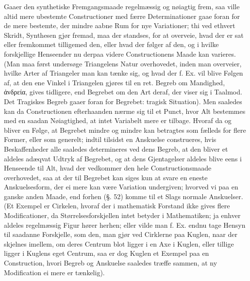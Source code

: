 \documentclass[12pt]{book}
\def\textit#1{#1}%
\def\emph#1{#1}%
\newcommand{\opage}[1]{\marginnote{\footnotesize\textit{[#1]}}}
\begin{document}
Gaaer den synthetiske Fremgangsmaade regelmæssig og nøiagtig frem, saa ville
altid mere ubestemte Constructioner med færre Determinationer gaae foran for de
mere bestemte, der mindre aabne Rum for nye Variationer; thi ved ethvert
Skridt, Synthesen gjør fremad, maa der standses, for at overveie, hvad der er
sat eller fremkommet tilligemed den, eller hvad der følger af den, og i hvilke
forskjellige Henseender nu derpaa videre Constructionens Maade kan varieres.
(Man maa først undersøge Triangelens Natur overhovedet, inden man overveier,
hvilke Arter af Triangeler man kan tænke sig,
\opage{176} og hvad der f. Ex. vil blive Følgen af, at den ene Vinkel i Triangelen gjøres
til en ret. Begreb om Mandighed, \textit{ἀνδρεία}, gives tidligere, end
Begrebet om den Art deraf, der viser sig i Taalmod. Det Tragiskes Begreb gaaer
foran for Begrebet: tragisk Situation).
Men saaledes kan da Constructionen efterhaanden nærme sig til et Punct, hvor
Alt bestemmes med en saadan Nøiagtighed, at intet Variabelt mere er tilbage.
Hvoraf da og bliver en Følge, at Begrebet mindre og mindre kan betragtes som
fælleds for flere Former, eller som generelt; indtil tilsidst en Anskuelse
construeres, hvis Beskaffenheder alle saaledes determineres ved dens Begreb, at
den bliver et aldeles adæqvat Udtryk af Begrebet, og at dens Gjentagelser
aldeles blive eens i Henseende til Alt, hvad der vedkommer den hele
Constructionsmaade overhovedet, saa at der til Begrebet kan siges kun at svare
en eneste Anskuelsesform, der ei mere kan være Variation undergiven; hvorved vi
paa en ganske anden Maade, end forhen (§. 52) komme til et Slags
\emph{normale Anskuelser}. (Et Exempel er Cirkelen, hvoraf der i mathematisk
Forstand ikke gives flere Modificationer, da Størrelsesforskjellen intet
betyder i Mathematiken; ja enhver aldeles regelmæssig Figur hører herhen; eller
vilde man f. Ex. endnu tage Hensyn til saadanne Forskjelle, som den, man gjør
ved Cirklerne paa Kuglen, naar der skjelnes imellem, om deres Centrum blot
ligger i en Axe i Kuglen, eller tillige
\opage{177} ligger i Kuglens eget Centrum, saa er dog Kuglen et Exempel paa en
Construction, hvori Begreb og Anskuelse saaledes træffe sammen, at ny
Modification ei mere er tænkelig).
\end{document}
